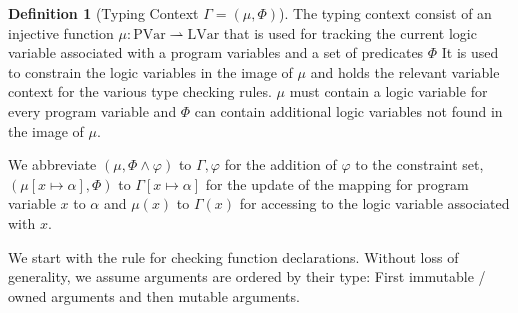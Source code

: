 \documentclass[twoside, english]{sdqthesis}
\theoremstyle{definition}
\newtheorem{definition}[theorem]{Definition}
\begin{document}
\begin{definition}[Typing Context $\Gamma = (\mu, \Phi)$]
  The typing context consist of an injective function $\mu : \text{PVar} \rightharpoonup \text{LVar}$ that is used for tracking the current logic variable associated with a program variables and a set of predicates $\Phi$
  It is used to constrain the logic variables in the image of $\mu$ and holds the relevant variable context for the various type checking rules.
  $\mu$ must contain a logic variable for every program variable and $\Phi$ can contain additional logic variables not found in the image of $\mu$.

  We abbreviate $(\mu, \Phi \wedge \varphi)$ to $\Gamma, \varphi$ for the addition of $\varphi$ to the constraint set, $(\mu[x \mapsto \alpha], \Phi)$ to $\Gamma[x \mapsto \alpha]$ for the update of the mapping for program variable $x$ to $\alpha$ and 
  $\mu(x)$ to $\Gamma(x)$ for accessing to the logic variable associated with $x$.
\end{definition}

We start with the rule for checking function declarations.
Without loss of generality, we assume arguments are ordered by their type: First immutable / owned arguments and then mutable arguments.
\end{document}
